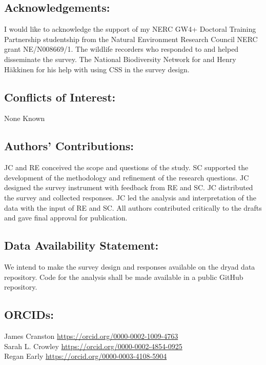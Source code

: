 \documentclass[
]{article}
\begin{document}
\hypertarget{acknowledgements}{%
\subsection{Acknowledgements:}\label{acknowledgements}}

I would like to acknowledge the support of my NERC GW4+ Doctoral
Training Partnership studentship from the Natural Environment Research
Council NERC grant NE/N008669/1. The wildlife recorders who responded to
and helped disseminate the survey. The National Biodiversity Network for
and Henry Häkkinen for his help with using CSS in the survey design.

\hypertarget{conflicts-of-interest}{%
\subsection{Conflicts of Interest:}\label{conflicts-of-interest}}

None Known

\hypertarget{authors-contributions}{%
\subsection{Authors' Contributions:}\label{authors-contributions}}

JC and RE conceived the scope and questions of the study. SC supported
the development of the methodology and refinement of the research
questions. JC designed the survey instrument with feedback from RE and
SC. JC distributed the survey and collected responses. JC led the
analysis and interpretation of the data with the input of RE and SC. All
authors contributed critically to the drafts and gave final approval for
publication.

\hypertarget{data-availability-statement}{%
\subsection{Data Availability
Statement:}\label{data-availability-statement}}

We intend to make the survey design and responses available on the dryad
data repository. Code for the analysis shall be made available in a
public GitHub repository.

\hypertarget{orcids}{%
\subsection{ORCIDs:}\label{orcids}}

James Cranston \url{https://orcid.org/0000-0002-1009-4763}\\
Sarah L. Crowley \url{https://orcid.org/0000-0002-4854-0925}\\
Regan Early \url{https://orcid.org/0000-0003-4108-5904}
\end{document}
